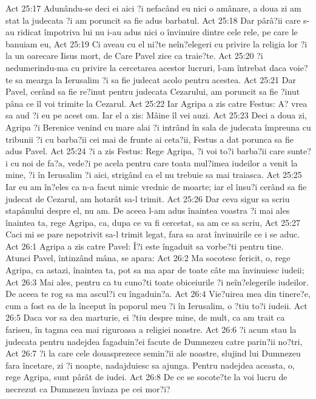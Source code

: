Act 25:17  Adunându-se deci ei aici ?i nefacând eu nici o amânare, a doua zi am stat la judecata ?i am poruncit sa fie adus barbatul.
Act 25:18  Dar pârâ?ii care s-au ridicat împotriva lui nu i-au adus nici o învinuire dintre cele rele, pe care le banuiam eu,
Act 25:19  Ci aveau cu el ni?te neîn?elegeri cu privire la religia lor ?i la un oarecare Iisus mort, de Care Pavel zice ca traie?te.
Act 25:20  ?i nedumerindu-ma cu privire la cercetarea acestor lucruri, l-am întrebat daca voie?te sa mearga la Ierusalim ?i sa fie judecat acolo pentru acestea.
Act 25:21  Dar Pavel, cerând sa fie re?inut pentru judecata Cezarului, am poruncit sa fie ?inut pâna ce îl voi trimite la Cezarul.
Act 25:22  Iar Agripa a zis catre Festus: A? vrea sa aud ?i eu pe acest om. Iar el a zis: Mâine îl vei auzi.
Act 25:23  Deci a doua zi, Agripa ?i Berenice venind cu mare alai ?i intrând în sala de judecata împreuna cu tribunii ?i cu barba?ii cei mai de frunte ai ceta?ii, Festus a dat porunca sa fie adus Pavel.
Act 25:24  ?i a zis Festus: Rege Agripa, ?i voi to?i barba?ii care sunte?i cu noi de fa?a, vede?i pe acela pentru care toata mul?imea iudeilor a venit la mine, ?i în Ierusalim ?i aici, strigând ca el nu trebuie sa mai traiasca.
Act 25:25  Iar eu am în?eles ca n-a facut nimic vrednic de moarte; iar el însu?i cerând sa fie judecat de Cezarul, am hotarât sa-l trimit.
Act 25:26  Dar ceva sigur sa scriu stapânului despre el, nu am. De aceea l-am adus înaintea voastra ?i mai ales înaintea ta, rege Agripa, ca, dupa ce va fi cercetat, sa am ce sa scriu,
Act 25:27  Caci mi se pare nepotrivit sa-l trimit legat, fara sa arat învinuirile ce i se aduc.
Act 26:1  Agripa a zis catre Pavel: Î?i este îngaduit sa vorbe?ti pentru tine. Atunci Pavel, întinzând mâna, se apara:
Act 26:2  Ma socotesc fericit, o, rege Agripa, ca astazi, înaintea ta, pot sa ma apar de toate câte ma învinuiesc iudeii;
Act 26:3  Mai ales, pentru ca tu cuno?ti toate obiceiurile ?i neîn?elegerile iudeilor. De aceea te rog sa ma ascul?i cu îngaduin?a.
Act 26:4  Vie?uirea mea din tinere?e, cum a fost ea de la început în poporul meu ?i în Ierusalim, o ?tiu to?i iudeii.
Act 26:5  Daca vor sa dea marturie, ei ?tiu despre mine, de mult, ca am trait ca fariseu, în tagma cea mai riguroasa a religiei noastre.
Act 26:6  ?i acum stau la judecata pentru nadejdea fagaduin?ei facute de Dumnezeu catre parin?ii no?tri,
Act 26:7  ?i la care cele douasprezece semin?ii ale noastre, slujind lui Dumnezeu fara încetare, zi ?i noapte, nadajduiesc sa ajunga. Pentru nadejdea aceasta, o, rege Agripa, sunt pârât de iudei.
Act 26:8  De ce se socote?te la voi lucru de necrezut ca Dumnezeu înviaza pe cei mor?i?
